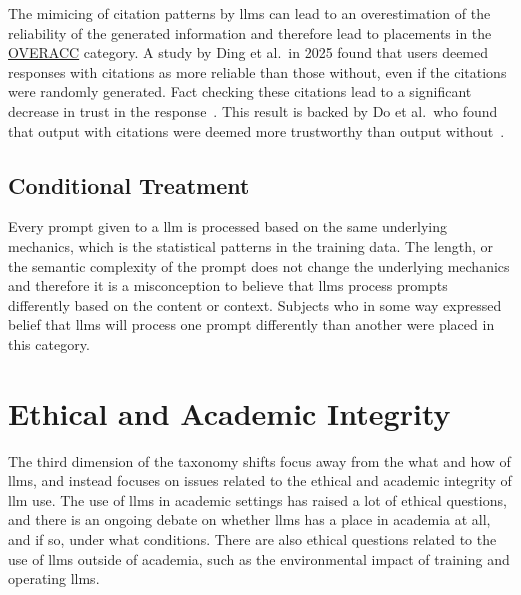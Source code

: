 The mimicing of citation patterns by \gls{llms} can lead to an overestimation of the reliability of the generated information and therefore lead to placements in the \hyperref[overacc]{OVERACC} category. A study by Ding et al.\ in 2025 found that users deemed responses with citations as more reliable than those without, even if the citations were randomly generated. Fact checking these citations lead to a significant decrease in trust in the response\ \cite{ding_citations_2025}. This result is backed by Do et al.\ who found that output with citations were deemed more trustworthy than output without\ \cite{do_facilitating_2024}.

\subsection{Conditional Treatment}\label{condtreat}
Every prompt given to a \gls{llm} is processed based on the same underlying mechanics, which is the statistical patterns in the training data. The length, or the semantic complexity of the prompt does not change the underlying mechanics and therefore it is a misconception to believe that \gls{llms} process prompts differently based on the content or context. Subjects who in some way expressed belief that \gls{llms} will process one prompt differently than another were placed in this category.

\section{Ethical and Academic Integrity}
The third dimension of the taxonomy shifts focus away from the what and how of \gls{llms}, and instead focuses on issues related to the ethical and academic integrity of \gls{llm} use. The use of \gls{llms} in academic settings has raised a lot of ethical questions, and there is an ongoing debate on whether \gls{llms} has a place in academia at all, and if so, under what conditions. There are also ethical questions related to the use of \gls{llms} outside of academia, such as the environmental impact of training and operating \gls{llms}.

